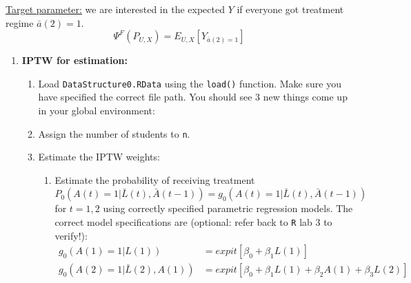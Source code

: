 \documentclass{exam}
\newenvironment{packed_item}{
\begin{itemize}
 \setlength{\itemsep}{0pt}
  \setlength{\parskip}{0pt}
  \setlength{\parsep}{0pt}
}{\end{itemize}}
\begin{document}
\noindent \underline{Target parameter:} we are interested in the expected $Y$ if everyone got treatment regime $\bar{a}(2) = 1$.
\[
\Psi^F(P_{U,X}) = E_{U,X}[Y_{\bar{a}(2)=1}]
\]

\begin{enumerate}
\item \textbf{IPTW for estimation:}
\begin{enumerate}
\item Load \texttt{DataStructure0.RData} using the \texttt{load()} function. Make sure you have specified the correct file path. You should see 3 new things come up in your global environment:
\item Assign the number of students to \texttt{n}.
\item Estimate the IPTW weights:
\begin{enumerate}
\item Estimate the probability of receiving treatment $P_0(A(t)=1|\bar{L}(t), \bar{A}(t-1)) = g_0(A(t)=1|\bar{L}(t), \bar{A}(t-1))$ for $t = 1,2$ using correctly specified parametric regression models. The correct model specifications are (optional: refer back to \texttt{R} lab 3 to verify!):
\begin{align*}
g_0(A(1)=1|L(1)) & = expit[\beta_0 + \beta_1L(1)] \\
g_0(A(2)=1|\bar{L}(2), A(1)) & = expit[\beta_0 + \beta_1L(1) + \beta_2A(1) + \beta_3L(2)]
\end{align*}

\end{enumerate}
\end{enumerate}
\end{enumerate}
\end{document}
